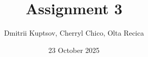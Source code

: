 \documentclass{article}
\begin{document}
\title{Assignment 3}
\author{Dmitrii Kuptsov, Cherryl Chico, Olta Recica}
\date{23 October 2025}
\maketitle

\section{}

\section{}

\end{document}
